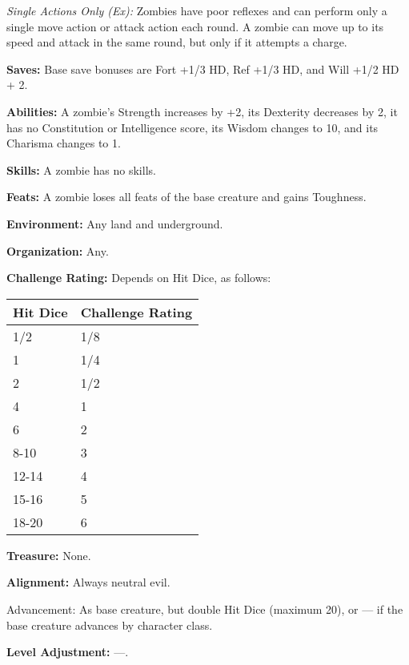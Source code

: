 \documentclass{article}
\begin{document}
\textit{Single Actions Only (Ex): }Zombies have poor reflexes and can perform only 
a single move action or attack action each round. A zombie can move up to its speed 
and attack in the same round, but only if it attempts a charge.

\textbf{Saves:} Base save bonuses are Fort +1/3 HD, Ref +1/3 HD, and Will +1/2 
HD + 2.

\textbf{Abilities:} A zombie's Strength increases by +2, its Dexterity decreases 
by 2, it has no Constitution or Intelligence score, its Wisdom changes to 10, and 
its Charisma changes to 1.

\textbf{Skills:} A zombie has no skills.

\textbf{Feats: }A zombie loses all feats of the base creature and gains Toughness.

\textbf{Environment:} Any land and underground. 

\textbf{Organization:} Any.

\textbf{Challenge Rating:} Depends on Hit Dice, as follows:

\begin{tabular}{|>{\raggedright}p{34pt}|>{\raggedright}p{73pt}|}
\hline
H\textbf{it Dice} & C\textbf{hallenge Rating}\tabularnewline
\hline
1/2 & 1/8\tabularnewline
\hline
1 & 1/4\tabularnewline
\hline
2 & 1/2\tabularnewline
\hline
4 & 1\tabularnewline
\hline
6 & 2\tabularnewline
\hline
8-10 & 3\tabularnewline
\hline
12-14 & 4\tabularnewline
\hline
15-16 & 5\tabularnewline
\hline
18-20 & 6\tabularnewline
\hline
\end{tabular}

\textbf{Treasure: }None.

\textbf{Alignment: }Always neutral evil.

Advancement: As base creature, but double Hit Dice (maximum 20), or --- if the 
base creature advances by character class.

\textbf{Level Adjustment:} ---.
\end{document}
